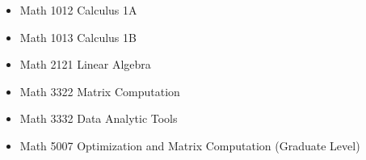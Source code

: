 \begin{itemize}
    \item Math 1012 Calculus 1A
    \item Math 1013 Calculus 1B
    \item Math 2121 Linear Algebra
    \item Math 3322 Matrix Computation
    \item Math 3332 Data Analytic Tools
    \item Math 5007 Optimization and Matrix Computation (Graduate Level)
\end{itemize}


